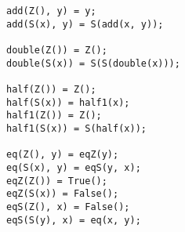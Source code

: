 \begin{lstlisting}[language=sll]
add(Z(), y) = y;
add(S(x), y) = S(add(x, y));

double(Z()) = Z();
double(S(x)) = S(S(double(x)));

half(Z()) = Z();
half(S(x)) = half1(x);
half1(Z()) = Z();
half1(S(x)) = S(half(x));

eq(Z(), y) = eqZ(y);
eq(S(x), y) = eqS(y, x);
eqZ(Z()) = True();
eqZ(S(x)) = False();
eqS(Z(), x) = False();
eqS(S(y), x) = eq(x, y);
\end{lstlisting}